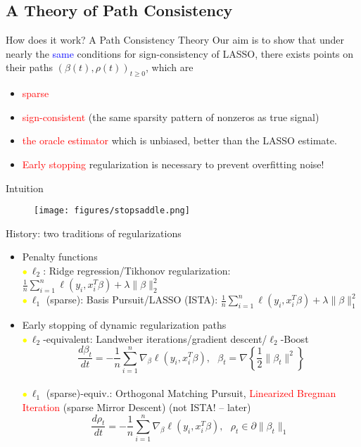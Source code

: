 \documentclass[slidestop,compress,9pt,epsfig,color]{beamer}
\theoremstyle{example}
\providecommand{\subitem}{\\ \textcolor{yellow}{$\bullet\ $}}
\begin{document}
\subsection{A Theory of Path Consistency}
\begin{frame}{How does it work? A Path Consistency Theory}
Our aim is to show that under nearly the \textcolor{blue}{same} conditions for sign-consistency of LASSO, there exists points on their paths $(\beta(t),\rho(t))_{t\ge 0}$, which are
\begin{itemize}
\item \textcolor{red}{sparse}
\item \textcolor{red}{sign-consistent} (the same sparsity pattern of nonzeros as true signal)
\item \textcolor{red}{the oracle estimator} which is unbiased, better than the LASSO estimate.
\item \textcolor{red}{Early stopping} regularization is necessary to prevent overfitting noise!
\end{itemize}
\end{frame}

\begin{frame}{Intuition}
\begin{figure}[!t]
\centering
    \texttt{[image: figures/stopsaddle.png]}
\end{figure}
\end{frame}

\begin{frame}{History: two traditions of regularizations}
\begin{itemize}
\item Penalty functions
\subitem $\ell_2$: Ridge regression/Tikhonov regularization:
$ \frac{1}{n}\sum_{i=1}^n \ell(y_i, x_i^T \beta) +  \lambda \|\beta\|_2^2 $
\subitem $\ell_1$ (sparse): Basis Pursuit/LASSO (ISTA):
$ \frac{1}{n}\sum_{i=1}^n \ell(y_i, x_i^T \beta) +  \lambda \|\beta\|_1^2 $
\item Early stopping of dynamic regularization paths
\subitem $\ell_2$-equivalent: Landweber iterations/gradient descent/$\ell_2$-Boost
\[ \frac{d\beta_t}{dt}  = - \frac{1}{n}\sum_{i=1}^n \nabla_\beta \ell(y_i, x_i^T \beta), \ \ \ \beta_t = \nabla \left\{ \frac{1}{2}  \|\beta_t\|^2\right\} \]
\subitem $\ell_1$ (sparse)-equiv.: Orthogonal Matching Pursuit, \textcolor{red}{Linearized Bregman Iteration} (sparse Mirror Descent) (not ISTA! -- later) 
\[ \frac{d\rho_t}{dt}  = - \frac{1}{n}\sum_{i=1}^n \nabla_\beta \ell(y_i, x_i^T \beta), \ \ \ \rho_t \in \partial \|\beta_t\|_1 \ \]
\end{itemize}
\end{frame}
\end{document}
